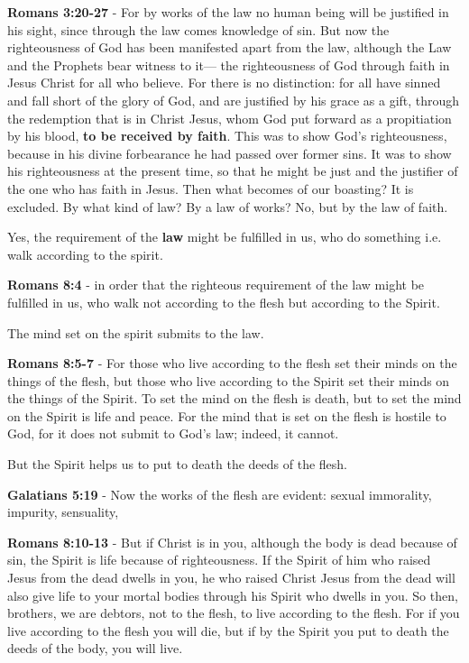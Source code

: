 \documentclass[11pt]{article}
\begin{document}
\textbf{Romans 3:20-27} - For by works of the law no human being will be justified in his sight, since through the law comes knowledge of sin. But now the righteousness of God has been manifested apart from the law, although the Law and the Prophets bear witness to it— the righteousness of God through faith in Jesus Christ for all who believe. For there is no distinction: for all have sinned and fall short of the glory of God, and are justified by his grace as a gift, through the redemption that is in Christ Jesus, whom God put forward as a propitiation by his blood, \textbf{to be received by faith}. This was to show God's righteousness, because in his divine forbearance he had passed over former sins. It was to show his righteousness at the present time, so that he might be just and the justifier of the one who has faith in Jesus. Then what becomes of our boasting? It is excluded. By what kind of law? By a law of works? No, but by the law of faith.

Yes, the requirement of the \textbf{law} might be fulfilled in us, who do something i.e. walk according to the spirit.

\textbf{Romans 8:4} - in order that the righteous requirement of the law might be fulfilled in us, who walk not according to the flesh but according to the Spirit.

The mind set on the spirit submits to the law.

\textbf{Romans 8:5-7} - For those who live according to the flesh set their minds on the things of the flesh, but those who live according to the Spirit set their minds on the things of the Spirit.  To set the mind on the flesh is death, but to set the mind on the Spirit is life and peace.  For the mind that is set on the flesh is hostile to God, for it does not submit to God's law; indeed, it cannot.

But the Spirit helps us to put to death the deeds of the flesh.

\textbf{Galatians 5:19} - Now the works of the flesh are evident: sexual immorality, impurity, sensuality,

\textbf{Romans 8:10-13} - But if Christ is in you, although the body is dead because of sin, the Spirit is life because of righteousness. If the Spirit of him who raised Jesus from the dead dwells in you, he who raised Christ Jesus from the dead will also give life to your mortal bodies through his Spirit who dwells in you. So then, brothers, we are debtors, not to the flesh, to live according to the flesh. For if you live according to the flesh you will die, but if by the Spirit you put to death the deeds of the body, you will live.
\end{document}
